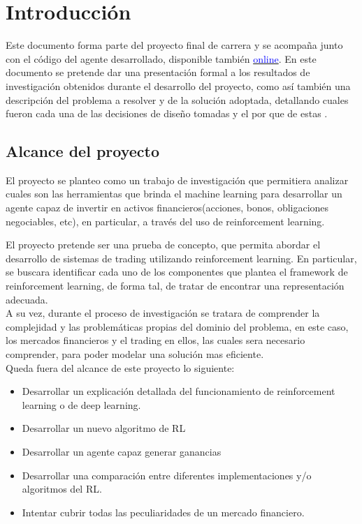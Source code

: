 \chapter{Introducción}

Este documento forma parte del proyecto final de carrera y se acompaña junto con el código del agente desarrollado, disponible también \href{https://github.com/jcaramello/deepQ-stock/}{\textcolor{blue}{online}}. En este documento se pretende dar una presentación formal a los resultados de investigación obtenidos durante el desarrollo del proyecto, como así también una descripción del problema a resolver y de la solución adoptada, detallando cuales fueron cada una de las decisiones de diseño tomadas y el por que de estas	.

\section{Alcance del proyecto}
El proyecto se planteo como un trabajo de investigación que permitiera analizar cuales son las herramientas que brinda el machine learning para desarrollar un agente capaz de invertir en activos financieros(acciones, bonos, obligaciones negociables, etc), en particular, a través  del uso de reinforcement learning.

El proyecto pretende ser una prueba de concepto, que permita abordar el desarrollo de sistemas de trading utilizando reinforcement learning. En particular, se buscara identificar cada uno de los componentes que plantea el framework de reinforcement learning, de forma tal, de tratar de encontrar una representación adecuada.
\\
A su vez, durante el proceso de investigación se tratara de comprender la complejidad y las problemáticas propias del dominio del problema, en este caso, los mercados financieros y el trading en ellos, las cuales sera necesario comprender, para poder modelar una solución mas eficiente.
\\
Queda fuera del alcance de este proyecto lo siguiente:

\begin{itemize} %
	\item Desarrollar un explicación detallada del funcionamiento de reinforcement learning o de deep learning.
	\item Desarrollar un nuevo algoritmo de RL
	\item Desarrollar un agente capaz generar ganancias
	\item Desarrollar una comparación entre diferentes implementaciones y/o algoritmos del RL.
    \item Intentar cubrir todas las peculiaridades de un mercado financiero.
\end{itemize}

